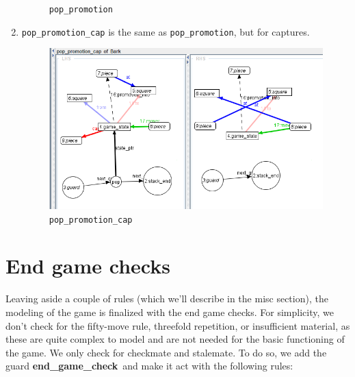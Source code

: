 \documentclass[a4paper, 10pt]{scrartcl}
\newcommand{\noderepr}[1]{\textsf{\textbf{#1}}}
\newcommand{\tellmewhy}{\noderepr{end\_game\_check}} %
\begin{document}
\begin{enumerate}
\begin{figure}[H]
            \caption{\texttt{pop\_promotion}}
        \end{figure}
        \item \texttt{pop\_promotion\_cap} is the same as \texttt{pop\_promotion}, but for captures.
        \begin{figure}[H]
            \centering
            \includegraphics[width=.8\linewidth]{images/pop_promotion_cap.png}
            \caption{\texttt{pop\_promotion\_cap}}
        \end{figure}
    \end{enumerate}

    \section{End game checks}
    Leaving aside a couple of rules (which we'll describe in the misc section), the modeling of the game is finalized with the end game checks. For simplicity, we don't check for the fifty-move rule, threefold repetition, or insufficient material, as these are quite complex to model and are not needed for the basic functioning of the game. We only check for checkmate and stalemate. To do so, we add the guard \tellmewhy\ and make it act with the following rules:
\end{document}

